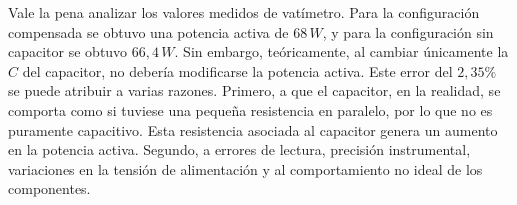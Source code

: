Vale la pena analizar los valores medidos de vatímetro. Para la configuración compensada se obtuvo una potencia activa de \(68\,W\), y para la configuración sin capacitor se obtuvo \(66{,}4\,W\). Sin embargo, teóricamente, al cambiar únicamente la \(C\) del capacitor, no debería modificarse la potencia activa. Este error del \(2{,}35\%\) se puede atribuir a varias razones. Primero, a que el capacitor, en la realidad, se comporta como si tuviese una pequeña resistencia en paralelo, por lo que no es puramente capacitivo. Esta resistencia asociada al capacitor genera un aumento en la potencia activa. Segundo, a errores de lectura, precisión instrumental, variaciones en la tensión de alimentación y al comportamiento no ideal de los componentes.

